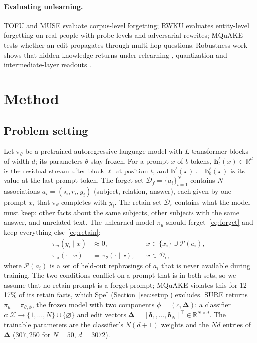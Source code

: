 \documentclass{article}
\theoremstyle{remark}
\theoremstyle{definition}
\newcommand{\R}{\mathbb{R}}
\begin{document}
\paragraph{Evaluating unlearning.}
TOFU \citep{maini2024tofu} and MUSE \citep{shi2025muse} evaluate corpus-level forgetting; RWKU \citep{jin2024rwku} evaluates entity-level forgetting on real people with probe levels and adversarial rewrites; MQuAKE \citep{zhong2023mquake} tests whether an edit propagates through multi-hop questions. Robustness work shows that hidden knowledge returns under relearning \citep{lynch2024eight,deeb2024unlearning,lucki2024adversarial}, quantization \citep{zhang2025quantization} and intermediate-layer readouts \citep{patil2024deleted}.

\section{Method}
\label{sec:method}

\subsection{Problem setting}
\label{sec:setting}
Let $\pi_\theta$ be a pretrained autoregressive language model with $L$ transformer blocks of width $d$; its parameters $\theta$ stay frozen. For a prompt $x$ of $b$ tokens, $\mathbf h^\ell_t(x)\in\R^d$ is the residual stream after block $\ell$ at position $t$, and $\mathbf h^\ell(x):=\mathbf h^\ell_b(x)$ is its value at the last prompt token. The forget set $\mathcal D_f=\{a_i\}_{i=1}^N$ contains $N$ associations $a_i=(s_i,r_i,y_i)$ (subject, relation, answer), each given by one prompt $x_i$ that $\pi_\theta$ completes with $y_i$. The retain set $\mathcal D_r$ contains what the model must keep: other facts about the same subjects, other subjects with the same answer, and unrelated text. The unlearned model $\pi_u$ should forget~\eqref{eq:forget} and keep everything else~\eqref{eq:retain}:
\begin{align}
 \pi_u(y_i\mid x)&\approx 0, && x\in\{x_i\}\cup\mathcal P(a_i),\label{eq:forget}\\
 \pi_u(\cdot\mid x)&=\pi_\theta(\cdot\mid x), && x\in\mathcal D_r,\label{eq:retain}
\end{align}
where $\mathcal P(a_i)$ is a set of held-out rephrasings of $a_i$ that is never available during training. The two conditions conflict on a prompt that is in both sets, so we assume that no retain prompt is a forget prompt; MQuAKE violates this for 12--17\% of its retain facts, which Spe$^\dagger$ (Section~\ref{sec:setup}) excludes. SURE returns $\pi_u=\pi_{\theta,\phi}$, the frozen model with two components $\phi=(c,\boldsymbol\Delta)$: a classifier $c:\mathcal X\to\{1,\dots,N\}\cup\{\varnothing\}$ and edit vectors $\boldsymbol\Delta=[\boldsymbol\delta_1,\dots,\boldsymbol\delta_N]^\top\in\R^{N\times d}$. The trainable parameters are the classifier's $N(d+1)$ weights and the $Nd$ entries of $\boldsymbol\Delta$ ($307{,}250$ for $N=50$, $d=3072$).
\end{document}

